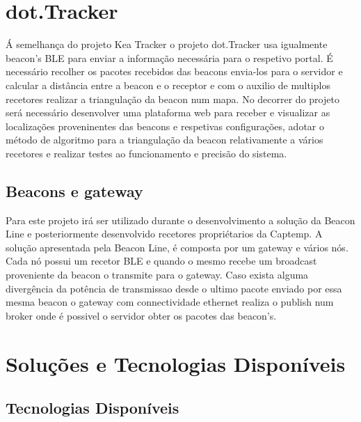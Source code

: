 \section {dot.Tracker}\label{dot}
Á semelhança do projeto Kea Tracker o projeto dot.Tracker usa igualmente beacon's BLE para enviar a informação necessária para o respetivo portal. É necessário recolher os pacotes recebidos das beacons envia-los para o servidor e calcular a distância entre a beacon e o receptor e com o auxilio de multiplos recetores realizar a triangulação da beacon num mapa. No decorrer do projeto será necessário desenvolver uma plataforma web para receber e visualizar as localizações proveninentes das beacons e respetivas configurações, adotar o método de algoritmo para a triangulação da beacon relativamente a vários recetores e realizar testes ao funcionamento e precisão do sistema.
\subsection{Beacons e gateway}
 Para este projeto irá ser utilizado durante o desenvolvimento a solução da Beacon Line\cite{taskit} e posteriormente desenvolvido recetores propriétarios da Captemp. A solução apresentada pela Beacon Line, é composta por um gateway e vários nós. Cada nó possui um recetor BLE e quando o mesmo recebe um broadcast proveniente da beacon o transmite para o gateway. Caso exista alguma divergência da potência de transmissao desde o ultimo pacote enviado por essa mesma beacon o gateway com connectividade ethernet realiza o publish num broker onde é possivel o servidor obter os pacotes das beacon's.



\section{Soluções e Tecnologias Disponíveis} \label{solucoesDisponiveis}
\subsection{Tecnologias Disponíveis}
